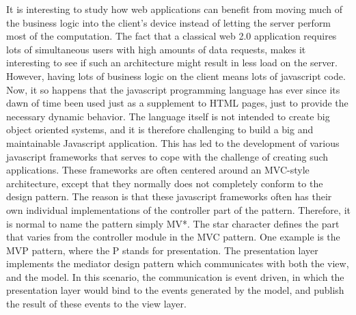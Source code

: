         It is interesting to study how web applications can benefit
        from moving much of the business logic into the client's device
        instead of letting the server perform most of the
        computation. The fact that a classical web 2.0 application
        requires lots of simultaneous users with high amounts of data
        requests, makes it interesting to see if such an architecture
        might result in less load on the server. However, having lots
        of business logic on the client means lots of javascript
        code. Now, it so happens that the javascript programming
        language has ever since its dawn of time been used just as a
        supplement to HTML pages, just to provide the necessary
        dynamic behavior. The language itself is not
        intended to create big object oriented systems, and it is
        therefore challenging to build a big and maintainable
        Javascript application. This has led to the development of various javascript
        frameworks that serves to cope with the challenge of creating
        such applications. These frameworks are often centered around
        an MVC-style architecture, except that they normally does not
        completely conform to the design pattern. The reason is that
        these javascript frameworks often has their own individual
        implementations of the controller part of the pattern. Therefore, it is
        normal to name the pattern simply MV*. The star character defines
        the part that varies from the controller module in the MVC pattern.
        One example is the MVP pattern, where the P stands for presentation. The
        presentation layer implements the mediator design pattern
        \cite{facade} which communicates with both the view, and the model. In this
        scenario, the communication is event driven, in which the
        presentation layer would bind to the events generated by the
        model, and publish the result of these events to the view
        layer. 

